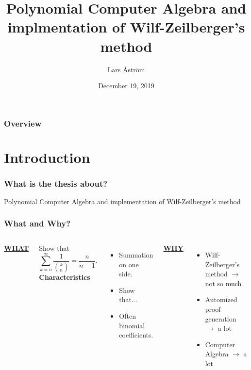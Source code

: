 \documentclass{beamer}
\title[Polynomial Computer Algebra and implmentation of Wilf-Zeilberger's method]{Polynomial Computer Algebra and implmentation of Wilf-Zeilberger's method} %
\author{Lars Åström} %
\institute[LTH] %
{
Supervisor: Victor Ufnarovski \\
\medskip
Faculty of Engineering at Lund University \\ %
\medskip
\textit{lars96astrom@gmail.com} %
}
\date{December 19, 2019} %
\newcommand{\ubf}[1]{\underline{\textbf{#1}}}
\begin{document}
\setlength{\abovedisplayskip}{2pt}
\setlength{\belowdisplayskip}{2pt}

\begin{frame}
\titlepage %
\end{frame}

\begin{frame}
\frametitle{Overview} %
\tableofcontents %
\end{frame}


\section{Introduction}
\begin{frame}
  \frametitle{What is the thesis about?}
  \Large
  Polynomial Computer Algebra
  \pause
  and implementation of Wilf-Zeilberger's method
\end{frame}

\begin{frame}
  \frametitle{What and Why?}
  \begin{columns}[t]

  \centering
  \Large\ubf{WHAT}\normalsize

  \justify
  Show that $$\sum_{k=n}^\infty \frac{1}{\binom{k}{n}}=\frac{n}{n-1}.$$
  \pause
  \textbf{Characteristics}
  \begin{itemize}
    \item Summation on one side.
    \item Show that...
    \item Often binomial coefficients.
  \end{itemize}
  \pause
  \centering
  \Large\ubf{WHY}\normalsize

  \justify
  \begin{itemize}
    \item Wilf-Zeilberger's method $\rightarrow$ not so much
    \pause
    \item Automized proof generation $\rightarrow$ a lot
    \pause
    \item Computer Algebra $\rightarrow$ a lot
  \end{itemize}
  \end{columns}
\end{frame}
\end{document}
